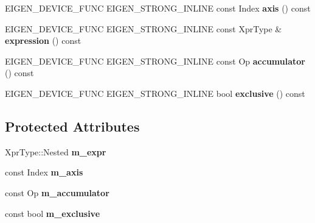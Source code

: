 \begin{DoxyCompactItemize}
\mbox{\label{class_eigen_1_1_tensor_scan_op_a209aa8763594b81f44a4b263cb95558c}} 
E\+I\+G\+E\+N\+\_\+\+D\+E\+V\+I\+C\+E\+\_\+\+F\+U\+NC E\+I\+G\+E\+N\+\_\+\+S\+T\+R\+O\+N\+G\+\_\+\+I\+N\+L\+I\+NE const Index {\bfseries axis} () const
\item 
\mbox{\label{class_eigen_1_1_tensor_scan_op_ab48bdf85f90d2041b04aa2d25cd41420}} 
E\+I\+G\+E\+N\+\_\+\+D\+E\+V\+I\+C\+E\+\_\+\+F\+U\+NC E\+I\+G\+E\+N\+\_\+\+S\+T\+R\+O\+N\+G\+\_\+\+I\+N\+L\+I\+NE const Xpr\+Type \& {\bfseries expression} () const
\item 
\mbox{\label{class_eigen_1_1_tensor_scan_op_a80a4a65581f606441a65842681536b19}} 
E\+I\+G\+E\+N\+\_\+\+D\+E\+V\+I\+C\+E\+\_\+\+F\+U\+NC E\+I\+G\+E\+N\+\_\+\+S\+T\+R\+O\+N\+G\+\_\+\+I\+N\+L\+I\+NE const Op {\bfseries accumulator} () const
\item 
\mbox{\label{class_eigen_1_1_tensor_scan_op_a8d3a0a38b3835e8644ed2f68a852e6c8}} 
E\+I\+G\+E\+N\+\_\+\+D\+E\+V\+I\+C\+E\+\_\+\+F\+U\+NC E\+I\+G\+E\+N\+\_\+\+S\+T\+R\+O\+N\+G\+\_\+\+I\+N\+L\+I\+NE bool {\bfseries exclusive} () const
\end{DoxyCompactItemize}
\subsection*{Protected Attributes}
\begin{DoxyCompactItemize}
\item 
\mbox{\label{class_eigen_1_1_tensor_scan_op_a53f92e1d598f2edff80aba2b92d97c28}} 
Xpr\+Type\+::\+Nested {\bfseries m\+\_\+expr}
\item 
\mbox{\label{class_eigen_1_1_tensor_scan_op_adce5b10a72e11e9fc1df9f06d399c257}} 
const Index {\bfseries m\+\_\+axis}
\item 
\mbox{\label{class_eigen_1_1_tensor_scan_op_a8622909f2e97fc080c19bbdc3301e3f5}} 
const Op {\bfseries m\+\_\+accumulator}
\item 
\mbox{\label{class_eigen_1_1_tensor_scan_op_a1c33b98ff834d01b0593d5fe43990c42}} 
const bool {\bfseries m\+\_\+exclusive}
\end{DoxyCompactItemize}
